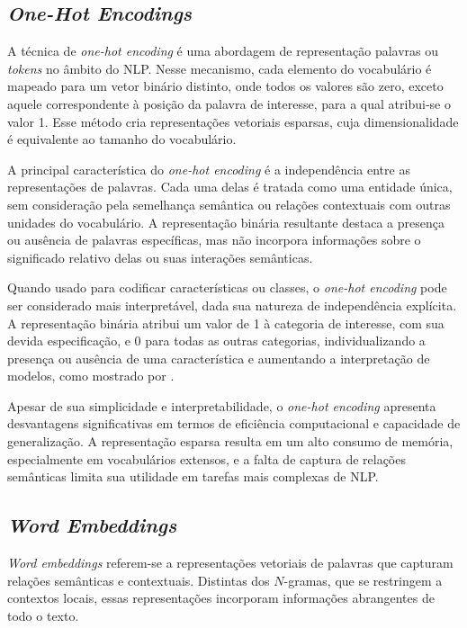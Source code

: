 \subsection{\textit{One-Hot Encodings}}

A técnica de \textit{one-hot encoding} é uma abordagem de representação palavras ou \textit{tokens} no âmbito do NLP. Nesse mecanismo, cada elemento do vocabulário é mapeado para um vetor binário distinto, onde todos os valores são zero, exceto aquele correspondente à posição da palavra de interesse, para a qual atribui-se o valor 1. Esse método cria representações vetoriais esparsas, cuja dimensionalidade é equivalente ao tamanho do vocabulário.

A principal característica do \textit{one-hot encoding} é a independência entre as representações de palavras. Cada uma delas é tratada como uma entidade única, sem consideração pela semelhança semântica ou relações contextuais com outras unidades do vocabulário. A representação binária resultante destaca a presença ou ausência de palavras específicas, mas não incorpora informações sobre o significado relativo delas ou suas interações semânticas.

Quando usado para codificar características ou classes, o \textit{one-hot encoding} pode ser considerado mais interpretável, dada sua natureza de independência explícita. A representação binária atribui um valor de 1 à categoria de interesse, com sua devida especificação, e 0 para todas as outras categorias, individualizando a presença ou ausência de uma característica e aumentando a interpretação de modelos, como mostrado por \citet{manai2023impact}.

Apesar de sua simplicidade e interpretabilidade, o \textit{one-hot encoding} apresenta desvantagens significativas em termos de eficiência computacional e capacidade de generalização. A representação esparsa resulta em um alto consumo de memória, especialmente em vocabulários extensos, e a falta de captura de relações semânticas limita sua utilidade em tarefas mais complexas de NLP.

\subsection{\textit{Word Embeddings}}

\textit{Word embeddings} referem-se a representações vetoriais de palavras que capturam relações semânticas e contextuais. Distintas dos $N$-gramas, que se restringem a contextos locais, essas representações incorporam informações abrangentes de todo o texto.

